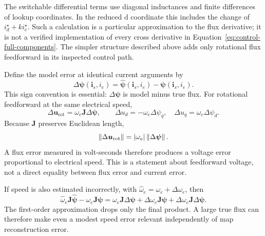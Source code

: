 The switchable differential terms use diagonal inductances and finite differences of lookup coordinates. In the reduced d coordinate this includes the change of $i_d^\star+ki_e^\star$. Such a calculation is a particular approximation to the flux derivative; it is not a verified implementation of every cross derivative in Equation~\eqref{eq:control-full-components}. The simpler structure described above adds only rotational flux feedforward in its inspected control path.

Define the model error at identical current arguments by
\begin{equation}
 \Delta\bm\psi(\bm i_s,i_e)=
 \widehat{\bm\psi}(\bm i_s,i_e)-\bm\psi(\bm i_s,i_e).
 \label{eq:control-error-sign}
\end{equation}
This sign convention is essential: $\Delta\bm\psi$ is model minus true flux. For rotational feedforward at the same electrical speed,
\begin{equation}
 \Delta\bm u_{\mathrm{rot}}=\omega_e\bm J\Delta\bm\psi,
 \qquad
 \Delta u_d=-\omega_e\Delta\psi_q,
 \quad \Delta u_q=\omega_e\Delta\psi_d.
 \label{eq:control-flux-voltage-error}
\end{equation}
Because $\bm J$ preserves Euclidean length,
\begin{equation}
 \left\lVert\Delta\bm u_{\mathrm{rot}}\right\rVert
 =|\omega_e|\left\lVert\Delta\bm\psi\right\rVert.
\end{equation}
A flux error measured in volt-seconds therefore produces a voltage error proportional to electrical speed. This is a statement about feedforward voltage, not a direct equality between flux error and current error.

If speed is also estimated incorrectly, with $\widehat\omega_e=\omega_e+\Delta\omega_e$, then
\begin{equation}
 \widehat\omega_e\bm J\widehat{\bm\psi}
 -\omega_e\bm J\bm\psi
 =\omega_e\bm J\Delta\bm\psi
 +\Delta\omega_e\bm J\bm\psi
 +\Delta\omega_e\bm J\Delta\bm\psi.
\end{equation}
The first-order approximation drops only the final product. A large true flux can therefore make even a modest speed error relevant independently of map reconstruction error.


